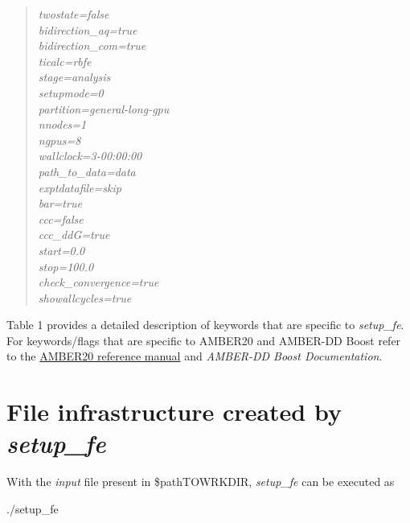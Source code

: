 \documentclass[11pt,letterpaper,titlepage]{article}
\newenvironment{itquote}
  {\begin{quote}\itshape}
  {\end{quote}\ignorespacesafterend}
\begin{document}
\begin{itquote}
{twostate=false 					\\
bidirection\_aq=true 				\\
bidirection\_com=true 				\\

ticalc=rbfe                      		\\
stage=analysis                   		\\
setupmode=0                      		\\

partition=general-long-gpu       		\\
nnodes=1                        		\\
ngpus=8                        			\\
wallclock=3-00:00:00          			\\

path\_to\_data=data 				\\
exptdatafile=skip 				\\
bar=true 					\\
ccc=false 					\\
ccc\_ddG=true 					\\
start=0.0 					\\
stop=100.0 					\\
check\_convergence=true 			\\
showallcycles=true 				\\

}

\end{itquote}

Table 1 provides a detailed description of keywords that are specific to \textit{setup\_fe}. For 
keywords/flags that are specific to AMBER20 and AMBER-DD Boost refer to the 
\href{https://ambermd.org/doc12/Amber20.pdf}{AMBER20 reference manual}
and \textit{AMBER-DD Boost Documentation}.


\vspace{1cm}
\section{File infrastructure created by \textit{setup\_fe}}
\vspace{1cm}

With the \textit{input} file present in \$pathTOWRKDIR, \textit{setup\_fe} can be executed as 

\vspace{0.1cm}
\centerline{./setup\_fe}
\vspace{0.1cm}
\end{document}
